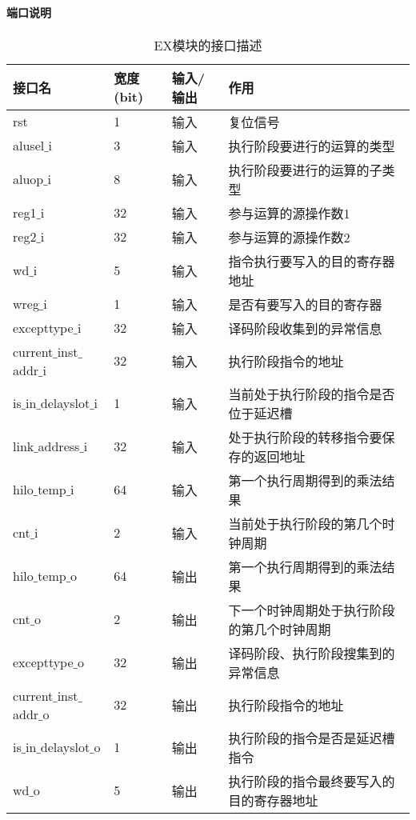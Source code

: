 \paragraph{端口说明}
\quad

\quad
\begin{table}[H]
	\centering
	\caption{EX模块的接口描述}
	\begin{tabular}{|l|l|l|l|}
		\hline
		接口名 & 宽度(bit) & 输入/输出 & 作用 \\
		\hline
		rst & 1 & 输入 & 复位信号 \\
		\hline
		alusel$\_$i & 3 & 输入 & 执行阶段要进行的运算的类型 \\
		\hline
		aluop$\_$i & 8 & 输入 & 执行阶段要进行的运算的子类型 \\
		\hline
		reg1$\_$i & 32 & 输入 & 参与运算的源操作数1 \\
		\hline
		reg2$\_$i & 32 & 输入 & 参与运算的源操作数2 \\
		\hline
		wd$\_$i & 5 & 输入 & 指令执行要写入的目的寄存器地址 \\
		\hline
		wreg$\_$i & 1 & 输入 & 是否有要写入的目的寄存器 \\
		\hline
		excepttype$\_$i & 32 & 输入 & 译码阶段收集到的异常信息 \\
		\hline
		current$\_$inst$\_$addr$\_$i & 32 & 输入 & 执行阶段指令的地址 \\
		\hline
		is$\_$in$\_$delayslot$\_$i & 1 & 输入 & 当前处于执行阶段的指令是否位于延迟槽 \\
		\hline
		link$\_$address$\_$i & 32 & 输入 & 处于执行阶段的转移指令要保存的返回地址 \\
		\hline
		hilo$\_$temp$\_$i & 64 & 输入 & 第一个执行周期得到的乘法结果 \\
		\hline
		cnt$\_$i & 2 & 输入 & 当前处于执行阶段的第几个时钟周期 \\
		\hline
		hilo$\_$temp$\_$o & 64 & 输出 & 第一个执行周期得到的乘法结果 \\
		\hline
		cnt$\_$o & 2 & 输出 & 下一个时钟周期处于执行阶段的第几个时钟周期 \\
		\hline
		excepttype$\_$o & 32 & 输出 & 译码阶段、执行阶段搜集到的异常信息 \\
		\hline
		current$\_$inst$\_$addr$\_$o & 32 & 输出 & 执行阶段指令的地址 \\
		\hline
		is$\_$in$\_$delayslot$\_$o & 1 & 输出 & 执行阶段的指令是否是延迟槽指令 \\
		\hline
		wd$\_$o & 5 & 输出 & 执行阶段的指令最终要写入的目的寄存器地址 \\

\end{tabular}
\end{table}
